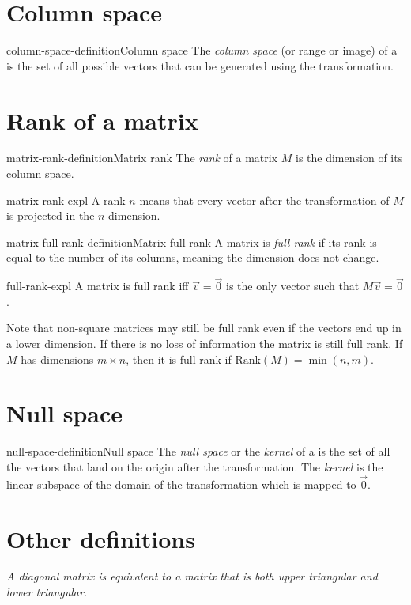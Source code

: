 \documentclass[preview]{standalone}
\begin{document}
\section{Column space}

\begin{snippetdefinition}{column-space-definition}{Column space}
    The \textit{column space} (or range or image) of a \matrix is the
    set of all possible vectors that can be generated using the transformation.
\end{snippetdefinition}

\section{Rank of a matrix}

\begin{snippetdefinition}{matrix-rank-definition}{Matrix rank}
    The \textit{rank} of a matrix \(M\) is the dimension of its column space.
\end{snippetdefinition}

\begin{snippet}{matrix-rank-expl}
    A rank \(n\) means that every vector after the transformation of \(M\)
    is projected in the \(n\)-dimension.
\end{snippet}

\begin{snippetdefinition}{matrix-full-rank-definition}{Matrix full rank}
    A matrix is \textit{full rank} if its rank is equal to the number of its columns, meaning
    the dimension does not change.
\end{snippetdefinition}

\begin{snippet}{full-rank-expl}
    A matrix is full rank iff \(\vec{v}=\vec{0}\) is the only vector such that \(M\vec{v}=\vec{0}\).
    
    Note that non-square matrices may still be full rank even if the vectors end up in a lower dimension.
    If there is no loss of information the matrix is still full rank.
    If \(M\) has dimensions \(m \times n\), then it is full rank if \(\text{Rank}(M)=\min(n,m)\).
\end{snippet}

\section{Null space}

\begin{snippetdefinition}{null-space-definition}{Null space}
    The \textit{null space} or the \textit{kernel} of a \matrix is the set of all the vectors that land on the origin
    after the transformation.
    The \textit{kernel} is the linear subspace of the domain of the transformation which is mapped to \(\vec{0}\).
\end{snippetdefinition}

\section{Other definitions}


\textit{A diagonal matrix is equivalent to a matrix that is both upper triangular and lower triangular.}
\end{document}
